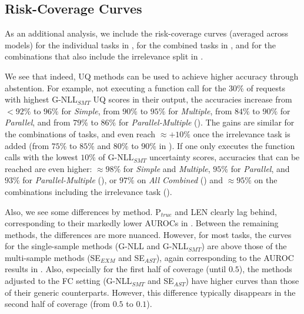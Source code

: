 \subsection{Risk-Coverage Curves}
\label{sec:risk_coverage}


As an additional analysis, we include the risk-coverage curves (averaged across models) for the individual tasks in , for the combined tasks in , and for the combinations that also include the irrelevance split in .

We see that indeed, UQ methods can be used to achieve higher accuracy through abstention. For example, not executing a function call for the 30\% of requests with highest G-NLL$_{SMT}$ UQ scores in their output, the accuracies increase from $<92 \%$ to $96 \%$  for \emph{Simple}, from $90 \%$ to $95 \%$ for \emph{Multiple}, from $84 \%$ to $90 \%$ for \emph{Parallel}, and from $79 \%$ to $86 \%$ for \emph{Parallel-Multiple} (). The gains are similar for the combinations of tasks, and even reach $\approx +10 \%$ once the irrelevance task is added (from $75 \%$ to $85 \%$ and $80\%$ to $90 \%$ in ). 
If one only executes the function calls with the lowest $10 \%$ of G-NLL$_{SMT}$ uncertainty scores, accuracies that can be reached are even higher: $ \approx 98 \%$ for  \emph{Simple} and \emph{Multiple}, $95 \%$ for \emph{Parallel}, and $93 \%$ for \emph{Parallel-Multiple} (), or $97 \%$ on \emph{All Combined} () and $\approx 95 \%$ on the combinations including the irrelevance task ().

Also, we see some differences by method. P$_{true}$ and LEN clearly lag behind, corresponding to their markedly lower AUROCs in . Between the remaining methods, the differences are more nuanced. However, for most tasks, the curves for the single-sample methods (G-NLL and G-NLL$_{SMT}$) are above those of the multi-sample methods (SE$_{EXM}$ and SE$_{AST}$), again corresponding to the AUROC results in . Also, especially for the first half of coverage (until $0.5$), the methods adjusted to the FC setting (G-NLL$_{SMT}$ and SE$_{AST}$) have higher curves than those of their generic counterparts. However, this difference typically disappears in the second half of coverage (from $0.5$ to $0.1$).



